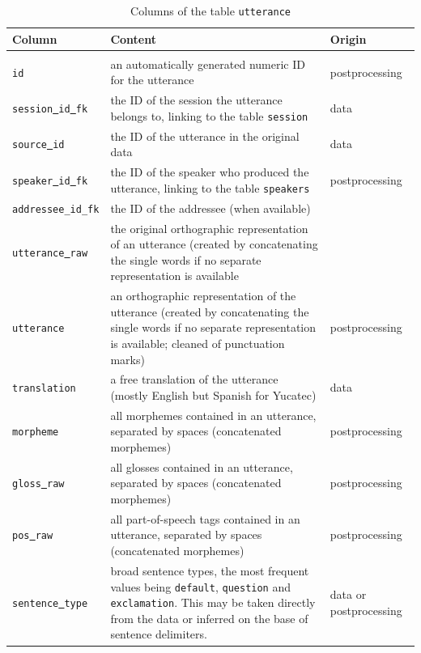 \documentclass[a4paper, 11pt]{book}
\newcommand{\und}{\underline{{ }}\hspace{0.2mm}}	%
\begin{document}
\begin{longtable}{lp{.5\linewidth}p{.2\linewidth}}
	\toprule
		\textbf{Column} & \textbf{Content} 	& \textbf{Origin} \\
	\midrule
	\endhead
	
	\bottomrule\\[-0.15cm]
	\caption{Columns of the table \texttt{utterance}}
	\endfoot

		\texttt{id}				& an automatically generated numeric ID for the utterance & postprocessing \\
		\texttt{session\und id\und fk} & the ID of the session the utterance belongs to, linking to the table \texttt{session} & data \\
		\texttt{source\und id} 	& the ID of the utterance in the original data & data \\
		\texttt{speaker\und id\und fk} & the ID of the speaker who produced the utterance, linking to the table \texttt{speakers} & postprocessing \\
		\texttt{addressee\_id\_fk}		& the ID of the addressee (when available) \\
		\texttt{utterance\und raw} & the original orthographic representation of an utterance (created by concatenating the single words if no separate representation is available &  \\ 
		\texttt{utterance}		& an orthographic representation of the utterance (created by concatenating the single words if no separate representation is available; cleaned of punctuation marks) & postprocessing \\
		\texttt{translation}	& a free translation of the utterance (mostly English but Spanish for Yucatec) & data \\
		\texttt{morpheme}		& all morphemes contained in an utterance, separated by spaces (concatenated morphemes) & postprocessing \\
		\texttt{gloss\und raw}  & all glosses contained in an utterance, separated by spaces (concatenated morphemes) & postprocessing  \\
		\texttt{pos\und raw}	& all part-of-speech tags contained in an utterance, separated by spaces (concatenated morphemes) & postprocessing \\
		\texttt{sentence\und type} &	broad sentence types, the most frequent values being \texttt{default}, \texttt{question} and \texttt{exclamation}. This may be taken directly from the data or inferred on the base of sentence delimiters. & data or postprocessing \\

\end{longtable}
\end{document}
